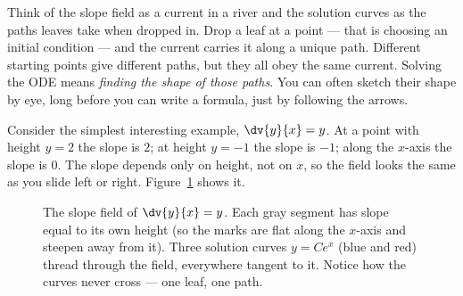 \begin{intuitionbox}
Think of the slope field as a current in a river and the solution curves as the
paths leaves take when dropped in. Drop a leaf at a point --- that is choosing an
initial condition --- and the current carries it along a unique path. Different
starting points give different paths, but they all obey the same current. Solving
the ODE means \emph{finding the shape of those paths}. You can often sketch their
shape by eye, long before you can write a formula, just by following the arrows.
\end{intuitionbox}

Consider the simplest interesting example, $\dv{y}{x} = y$. At a point with height
$y=2$ the slope is $2$; at height $y=-1$ the slope is $-1$; along the $x$-axis the
slope is $0$. The slope depends only on height, not on $x$, so the field looks the
same as you slide left or right. Figure~\ref{ch37:slopefield-exp} shows it.

\begin{figure}[H]
\centering
{}
\caption{The slope field of $\dv{y}{x}=y$. Each gray segment has slope equal to its
own height (so the marks are flat along the $x$-axis and steepen away from it).
Three solution curves $y=Ce^{x}$ (blue and red) thread through the field, everywhere
tangent to it. Notice how the curves never cross --- one leaf, one path.}
\label{ch37:slopefield-exp}
\end{figure}

